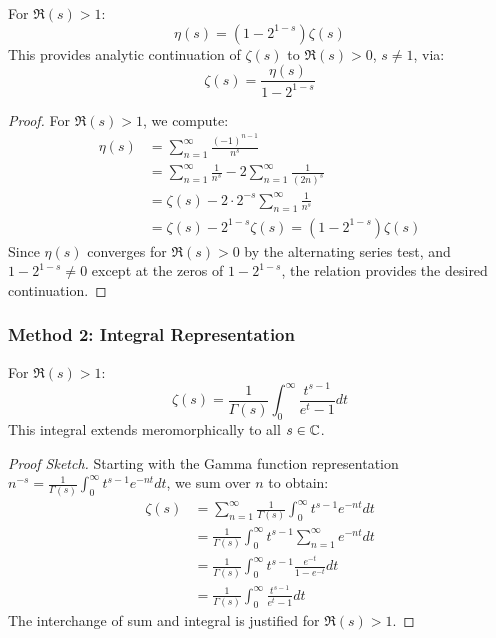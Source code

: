\begin{theorem}
\label{thm:eta_zeta_relation}
For $\Re(s) > 1$:
\begin{equation}
\eta(s) = (1 - 2^{1-s})\zeta(s)
\label{eq:eta_zeta_relation}
\end{equation}
This provides analytic continuation of $\zeta(s)$ to $\Re(s) > 0$, $s \neq 1$, via:
\begin{equation}
\zeta(s) = \frac{\eta(s)}{1 - 2^{1-s}}
\end{equation}
\end{theorem}

\begin{proof}
For $\Re(s) > 1$, we compute:
\begin{align}
\eta(s) &= \sum_{n=1}^{\infty} \frac{(-1)^{n-1}}{n^s} \\
&= \sum_{n=1}^{\infty} \frac{1}{n^s} - 2\sum_{n=1}^{\infty} \frac{1}{(2n)^s} \\
&= \zeta(s) - 2 \cdot 2^{-s} \sum_{n=1}^{\infty} \frac{1}{n^s} \\
&= \zeta(s) - 2^{1-s}\zeta(s) = (1-2^{1-s})\zeta(s)
\end{align}
Since $\eta(s)$ converges for $\Re(s) > 0$ by the alternating series test, and $1-2^{1-s} \neq 0$ except at the zeros of $1-2^{1-s}$, the relation provides the desired continuation.
\end{proof}

\subsubsection{Method 2: Integral Representation}

\begin{theorem}
\label{thm:integral_representation}
For $\Re(s) > 1$:
\begin{equation}
\zeta(s) = \frac{1}{\Gamma(s)} \int_0^{\infty} \frac{t^{s-1}}{e^t - 1} dt
\label{eq:zeta_integral}
\end{equation}
This integral extends meromorphically to all $s \in \mathbb{C}$.
\end{theorem}

\begin{proof}[Proof Sketch]
Starting with the Gamma function representation $n^{-s} = \frac{1}{\Gamma(s)} \int_0^{\infty} t^{s-1} e^{-nt} dt$, we sum over $n$ to obtain:
\begin{align}
\zeta(s) &= \sum_{n=1}^{\infty} \frac{1}{\Gamma(s)} \int_0^{\infty} t^{s-1} e^{-nt} dt \\
&= \frac{1}{\Gamma(s)} \int_0^{\infty} t^{s-1} \sum_{n=1}^{\infty} e^{-nt} dt \\
&= \frac{1}{\Gamma(s)} \int_0^{\infty} t^{s-1} \frac{e^{-t}}{1-e^{-t}} dt \\
&= \frac{1}{\Gamma(s)} \int_0^{\infty} \frac{t^{s-1}}{e^t - 1} dt
\end{align}
The interchange of sum and integral is justified for $\Re(s) > 1$.
\end{proof}

